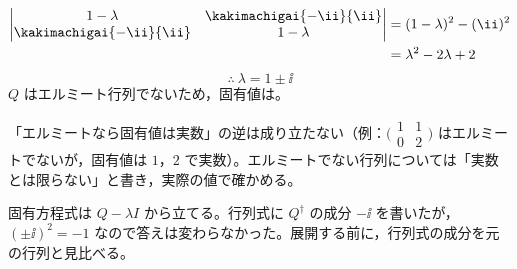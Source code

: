 \begin{align*}
\begin{vmatrix}1-\lambda & \kakimachigai{-\ii}{\ii}\\ \kakimachigai{-\ii}{\ii} & 1-\lambda\end{vmatrix}
&=(1-\lambda)^{2}-(\ii)^{2}\\
&=\lambda^{2}-2\lambda+2
\end{align*}
\[ \therefore\ \lambda=1\pm\ii \]
$Q$ はエルミート行列でないため，固有値は。
\item 「エルミートなら固有値は実数」の逆は成り立たない（例：$\bigl(\begin{smallmatrix}1&1\\0&2\end{smallmatrix}\bigr)$ はエルミートでないが，固有値は $1$，$2$ で実数）。エルミートでない行列については「実数とは限らない」と書き，実際の値で確かめる。
\item 固有方程式は $Q-\lambda I$ から立てる。行列式に $Q^{\dagger}$ の成分 $-\ii$ を書いたが，$(\pm\ii)^{2}=-1$ なので答えは変わらなかった。展開する前に，行列式の成分を元の行列と見比べる。
